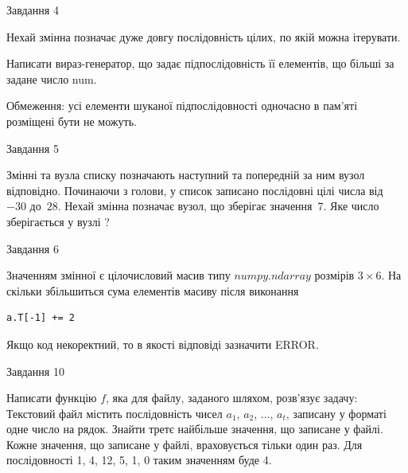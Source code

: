 \documentclass[12pt, ukrainian]{article}
\begin{document}
{               
{\begin{center}Завдання {4}\end{center}}
\vspace{-6mm}
Нехай змінна  позначає дуже довгу послідовність цілих, по якій можна ітерувати.

Написати вираз-генератор, що задає підпослідовність її елементів, що більші за задане число num.

Обмеження: усі елементи шуканої підпослідовності одночасно в пам'яті розміщені бути не можуть.\par

\vspace{10mm}
               
{\begin{center}Завдання {5}\end{center}}
\vspace{-6mm}
Змінні  та  вузла списку позначають наступний та попередній за ним вузол відповідно. Починаючи з голови, у список записано послідовні цілі числа від~$-30$ до~$28$. Нехай змінна  позначає вузол, що зберігає значення~$7$.
Яке число зберігається у вузлі  ?\par

               
{\begin{center}Завдання {6}\end{center}}
\vspace{-6mm}
Значенням змінної  є цілочисловий масив типу $numpy.ndarray$ розмірів $3{\times}6$. На скільки збільшиться сума елементів масиву  після виконання
\begin{verbatim}
a.T[-1] += 2
\end{verbatim}


Якщо код некоректний, то в якості відповіді зазначити ERROR.\par

               
{\begin{center}Завдання {10}\end{center}}
\vspace{-6mm}

Написати функцію $f$, яка для файлу, заданого шляхом, розв’язує задачу:\\ Текстовий файл містить послідовність чисел $a_1$, $a_2$, $\ldots$, $a_t$, записану у форматі одне число на рядок. Знайти третє найбільше значення, що записане у файлі. Кожне значення, що записане у файлі, враховується тільки один раз. Для послідовності 1, 4, 12, 5, 1, 0 таким значенням буде 4.

}
\end{document}
